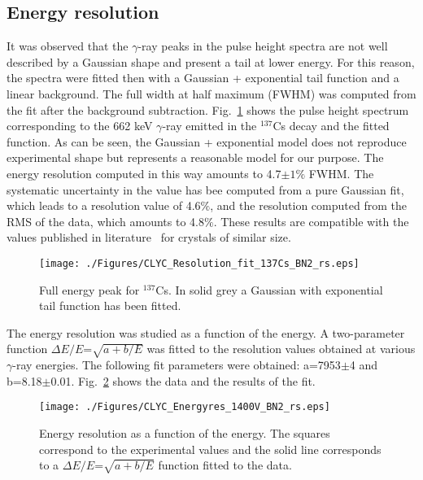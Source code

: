 \documentclass[review,number,sort&compress]{elsarticle}
\begin{document}
\subsection{Energy resolution}
\label{eneres}
It was observed that the $\gamma$-ray peaks in the pulse height spectra are not well described by a Gaussian shape and present a tail at lower energy. For this reason, the spectra were fitted then with a Gaussian + exponential tail function and a linear background. The full width at half maximum (FWHM) was computed from the fit after the background subtraction. Fig.~\ref{eres_cs} shows the pulse height spectrum corresponding to the 662 keV $\gamma$-ray emitted in the $^{137}$Cs decay and the fitted function. As can be seen, the Gaussian + exponential model does not reproduce experimental shape but represents a reasonable model for our purpose. The energy resolution computed in this way amounts to 4.7$\pm1\%$ FWHM. The systematic uncertainty in the value has bee computed from a pure Gaussian fit, which leads to a resolution value of 4.6$\%$, and the resolution computed from the RMS of the data, which amounts to 4.8$\%$. These results are compatible with the values published in literature~\cite{Glo1,Glo13} for crystals of similar size. 


\begin{figure}[h!]
\centering
\texttt{[image: ./Figures/CLYC\_Resolution\_fit\_137Cs\_BN2\_rs.eps]}
\caption{Full energy peak for $^{137}$Cs. In solid grey a Gaussian with exponential tail function has been fitted.}
\label{eres_cs}
\end{figure}

The energy resolution was studied as a function of the energy. A two-parameter function $\Delta E/E$=$\sqrt{a+b/E}$ was fitted to the resolution values obtained at various $\gamma$-ray energies. The following fit parameters were obtained: a=7953$\pm$4 and b=8.18$\pm$0.01. Fig.~\ref{energyres} shows the data and the results of the fit. 

\begin{figure}[h!]
\centering
\texttt{[image: ./Figures/CLYC\_Energyres\_1400V\_BN2\_rs.eps]}
\caption{Energy resolution as a function of the energy. The squares correspond to the experimental values and the solid line corresponds to a $\Delta E/E$=$\sqrt{a+b/E}$ function fitted to the data.}
\label{energyres}
\end{figure}
\end{document}
